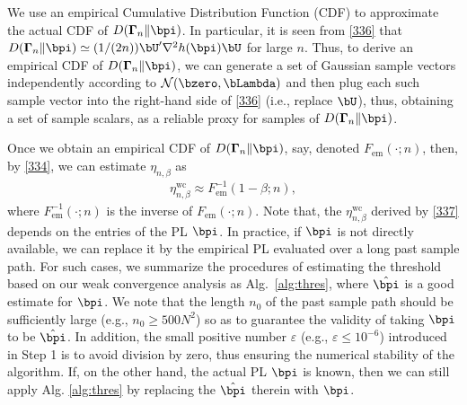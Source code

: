 \documentclass[10pt, twocolumn]{IEEEtran}
\begin{document}
We use an empirical Cumulative Distribution Function (CDF) to
approximate the actual CDF of $D( \boldsymbol{\Gamma}_n \|\bpi)$. In particular, it is seen from \eqref{336} that ${D}(
{{\boldsymbol{\Gamma} _n}\| {\bpi} } ) \simeq
(1/(2n)) {\bU^{\prime}}{\nabla ^2}h( {\bpi} )\bU$ for large $n$.
Thus, to derive an empirical CDF of ${D}( {{\boldsymbol{\Gamma} _n}\|
  {\bpi} } )$, we can generate a set of Gaussian sample vectors
independently according to $\mathcal{N}( {\bzero, \bLambda } )$ and then
plug each such sample vector into the right-hand side of \eqref{336}
(i.e., replace $\bU$), thus, obtaining a set of sample scalars, as a
reliable proxy for samples of ${D}( {{\boldsymbol{\Gamma} _n}\| {\bpi} }
)$.

Once we obtain an empirical CDF of ${D}( {{\boldsymbol{\Gamma}
      _n}\| {\bpi} } )$, say, denoted
${F_{\text{em}}}( \cdot ; n )$, then, by \eqref{334}, we can
estimate $\eta_{n,\beta}$ as
\begin{align}
\eta_{n,\beta}^{\text{wc}}  \approx F_{\text{em}}^{ - 1}( {1 - {\beta}}; n ),
\label{337}
\end{align}
where $F_{\text{em}}^{-1}(\cdot; n)$ is the inverse of
$F_{\text{em}}(\cdot; n)$. {Note that, the
  $\eta_{n,\beta}^{\text{wc}}$ derived by \eqref{337} depends on the
  entries of the PL $\bpi$. In practice, if ${\bpi}$ is not directly
  available, we can replace it by the empirical PL evaluated over a long
  past sample path. For such cases, we summarize the procedures of
  estimating the threshold based on our weak convergence analysis as
  Alg.~\ref{alg:thres}, where $\hat \bpi$ is a good estimate for
  ${\bpi}$. We note that the length $n_0$ of the past sample path should
  be sufficiently large (e.g., $n_0 \ge 500N^2$) so as to guarantee the
  validity of taking $\bpi$ to be $\hat \bpi$. In addition, the small
  positive number $\varepsilon$ (e.g., $\varepsilon \le 10^{-6}$)
  introduced in Step 1 is to avoid division by zero, thus ensuring the
  numerical stability of the algorithm. If, on the other hand, the
  actual PL $\bpi$ is known, then we can still apply
  Alg. \ref{alg:thres} by replacing the $\hat \bpi$ therein with
  $\bpi$.}
 
\end{document}
